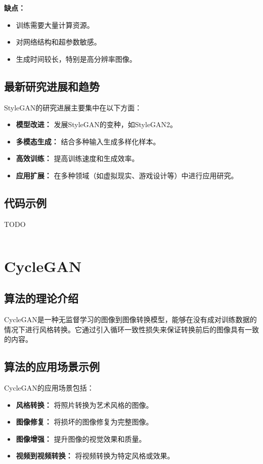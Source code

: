 \textbf{缺点：}
\begin{itemize}
    \item 训练需要大量计算资源。
    \item 对网络结构和超参数敏感。
    \item 生成时间较长，特别是高分辨率图像。
\end{itemize}

\subsection*{最新研究进展和趋势}
StyleGAN的研究进展主要集中在以下方面：
\begin{itemize}
    \item \textbf{模型改进：} 发展StyleGAN的变种，如StyleGAN2。
    \item \textbf{多模态生成：} 结合多种输入生成多样化样本。
    \item \textbf{高效训练：} 提高训练速度和生成效率。
    \item \textbf{应用扩展：} 在多种领域（如虚拟现实、游戏设计等）中进行应用研究。
\end{itemize}
\subsection*{代码示例}
TODO
\begin{lstlisting}

\end{lstlisting}


\section{CycleGAN}
\subsection*{算法的理论介绍}
CycleGAN是一种无监督学习的图像到图像转换模型，能够在没有成对训练数据的情况下进行风格转换。它通过引入循环一致性损失来保证转换前后的图像具有一致的内容。

\subsection*{算法的应用场景示例}
CycleGAN的应用场景包括：
\begin{itemize}
    \item \textbf{风格转换：} 将照片转换为艺术风格的图像。
    \item \textbf{图像修复：} 将损坏的图像修复为完整图像。
    \item \textbf{图像增强：} 提升图像的视觉效果和质量。
    \item \textbf{视频到视频转换：} 将视频转换为特定风格或效果。
\end{itemize}

